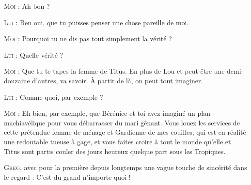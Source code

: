\begin{dialogue}
\textsc{Moi} : Ah bon ?

\textsc{Lui} : Ben oui, que tu puisses penser une chose pareille de moi.

\textsc{Moi} : Pourquoi tu ne dis pas tout simplement la vérité ?

\textsc{Lui} : Quelle vérité ?

%
%

\textsc{Moi} : Que tu te tapes la femme de Titus. En plus de Lou et peut-être une demi-douzaine d’autres, va savoir. À partir de là, on peut tout imaginer.

\textsc{Lui} : Comme quoi, par exemple ?

\textsc{Moi} : Eh bien, par exemple, que Bérénice et toi avez imaginé un plan machiavélique pour vous débarrasser du mari gênant. Vous louez les services de cette prétendue femme de ménage et Gardienne de mes couilles, qui est en réalité une redoutable tueuse à gage, et vous faites croire à tout le monde qu’elle et Titus sont partis couler des jours heureux quelque part sous les Tropiques.

\textsc{Greg}, avec pour la première depuis longtemps une vague touche de sincérité dans le regard : C’est du grand n’importe quoi !

\end{dialogue}


